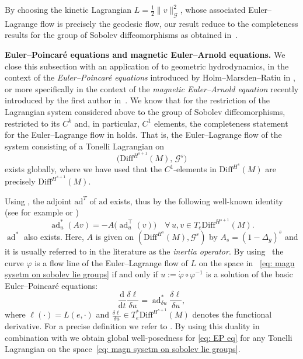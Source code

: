 \documentclass[11pt,reqno]{amsart}
\theoremstyle{plain}
\theoremstyle{definition}
\theoremstyle{plain} %
\theoremstyle{definition} %
\numberwithin{equation}{section}
\def\G{\mathcal{G}}
\def\d{\delta}
\def\d{\delta}
\def\d{{\mathrm{d}}}
\begin{document}
By choosing the kinetic Lagrangian \( L = \tfrac{1}{2} \|v \|_{\mathcal{G}}^2 \), whose associated Euler–Lagrange flow is precisely the geodesic flow, 
our result reduce to the completeness results for the group of Sobolev diffeomorphisms 
as obtained in~\cite{BruverisVialard2017}. 
\medskip

\textbf{Euler–Poincaré equations and magnetic Euler–Arnold equations.} 
We close this subsection with an application of  
to geometric hydrodynamics, in the context of the \emph{Euler–Poincaré equations} introduced by Holm–Marsden–Ratiu in \cite{HolmMardsenRatiuEulerPoincare}, 
or more specifically in the context of the \emph{magnetic Euler–Arnold equation} 
recently introduced by the first author in~\cite{maier2025geometrichydrodynamicsinfinitedimensional}. 
We know that for the restriction of the Lagrangian system 
considered above to the group of Sobolev diffeomorphisms, restricted to its \( C^k \) 
and, in particular, \( C^1 \) elements, the completeness statement for the Euler--Lagrange flow in  holds. 
That is, the Euler–Lagrange flow of the system consisting of a Tonelli Lagrangian on 
\begin{equation}\label{eq: magn sysetm on sobolev lie groups}
\big( \mathrm{Diff}^{H^{s+1}}(M),\, \mathcal{G}^s\big)
\end{equation}
exists globally, where we have used that the \( C^1 \)-elements in \( \mathrm{Diff}^{H^{s}}(M) \) are precisely \( \mathrm{Diff}^{H^{s+1}}(M) \).

Using \cite[Lemma 7.4]{Bauer_2025}, the adjoint $\mathrm{ad}^T$ of \( \mathrm{ad} \) exists, thus by the following well-known identity (see for example \cite{AK98,Vi08} or \cite[eq. (2.8)]{maier2025geometrichydrodynamicsinfinitedimensional}) \[
\operatorname{ad}^*_u (A v) = -A \big( \operatorname{ad}^\top_u (v) \big) \quad \forall\, u, v \in T_e \mathrm{Diff}^{H^{s+1}}(M).
\]
$\operatorname{ad}^*$ also exists. Here, $A$ is given on $(\mathrm{Diff}^{H^{s}}(M), \G^s)$ by \( A_s = (1 - \Delta_g)^s \) and it is usually referred to in the literature as the \textit{inertia operator}. By using~\cite[Thm. 1.2]{HolmMardsenRatiuEulerPoincare} the curve \( \varphi \) is a flow line of the Euler--Lagrange flow of $L$ on the space in ~\eqref{eq: magn sysetm on sobolev lie groups} if and only if \( u:= \dot{\varphi}\circ\varphi^{-1} \) is a solution of the basic Euler--Poincaré equations:
\begin{equation}\label{eq: EP eq}
    \frac{\d}{\d t}\frac{\delta \ell}{\delta u} = \operatorname{ad}^*_{\delta u}\frac{\delta \ell}{\delta u} \tag{EP},
\end{equation}
where $\ell(\cdot)=L(e,\cdot)$ and $\frac{\delta \ell}{\delta u}\in T^*_e \mathrm{Diff}^{H^{s+1}}(M)$ denotes the functional derivative. For a precise definition we refer to \cite{HolmMardsenRatiuEulerPoincare}.  By using this duality in combination with  we obtain global well-posedness for \eqref{eq: EP eq} for any Tonelli Lagrangian on  the space~\eqref{eq: magn sysetm on sobolev lie groups}.\\
\end{document}
